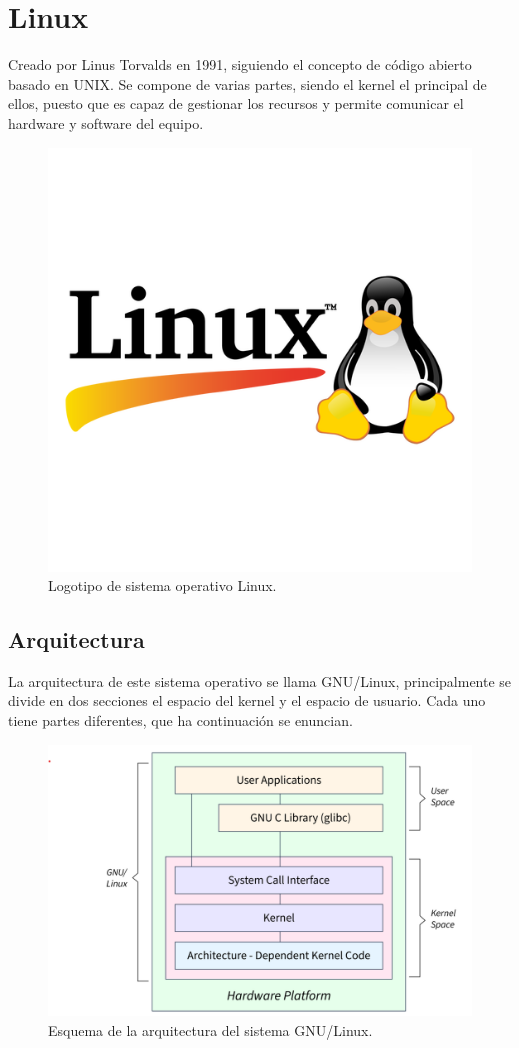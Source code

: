 \documentclass[10pt,a4paper,titlepage]{article}
\begin{document}
	\section*{Linux}
	Creado por Linus Torvalds en 1991, siguiendo el concepto de código abierto basado en UNIX. Se compone de varias partes, siendo el kernel el principal de ellos, puesto que es capaz de gestionar los recursos y permite comunicar el hardware y software del equipo.
	
	\begin{figure}[H]
		\centering
		\includegraphics[width=0.5\linewidth]{"./images/linux.png"}
		\caption{Logotipo de sistema operativo Linux.}
		\label{fig:logoLinux}
	\end{figure}
	
	\subsection*{Arquitectura}
	La arquitectura de este sistema operativo se llama GNU/Linux, principalmente se divide en dos secciones el espacio del kernel y el espacio de usuario. Cada uno tiene partes diferentes, que ha continuación se enuncian.
	
	\begin{figure}[H]
		\centering
		\includegraphics[width=0.9\linewidth]{"./images/arquitectura.png"}
		\caption{Esquema de la arquitectura del sistema GNU/Linux.}
		\label{fig:arquitectura}
	\end{figure}
	
\end{document}
